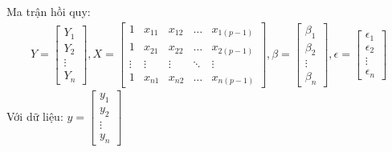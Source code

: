 \documentclass[a4paper]{article}
\newcommand{\gachdau}{\hspace*{1.5em}\ignorespaces}
\begin{document}
            \vspace{-22pt}
            \gachdau
            Ma trận hồi quy:\\
            \vspace{-18pt}
            \begin{align*}
                Y = 
                \begin{bmatrix}
                    Y_1 \\
                    Y_2 \\
                    \vdots \\
                    Y_n
                \end{bmatrix},
                X = 
                \begin{bmatrix}
                    1 & x_{11} & x_{12} & \ldots & x_{1(p-1)} \\
                    1 & x_{21} & x_{22} & \ldots & x_{2(p-1)} \\
                    \vdots & \vdots & \vdots & \ddots & \vdots \\
                    1 & x_{n1} & x_{n2} & \ldots & x_{n(p-1)}
                \end{bmatrix},
                \beta = 
                \begin{bmatrix}
                    \beta_1 \\
                    \beta_2 \\
                    \vdots \\
                    \beta_n
                \end{bmatrix},
                \epsilon = 
                \begin{bmatrix}
                    \epsilon_1 \\
                    \epsilon_2 \\
                    \vdots \\
                    \epsilon_n
                \end{bmatrix}
            \end{align*}
            \gachdau
            Với dữ liệu:
            $y = 
            \begin{bmatrix}
                y_1\\
                y_2\\
                \vdots\\
                y_n
            \end{bmatrix}
            $\\
            \gachdau
\end{document}
